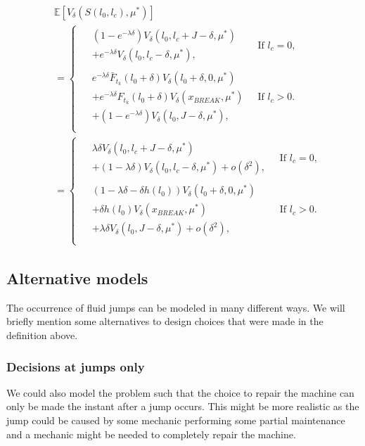 \documentclass[a4paper]{thesis}
\theoremstyle{definition}
\begin{document}
\begin{equation}\label{eq:SimpleFluidNextState}
\begin{split}
&\mathbb{E}[V_\delta(S(l_0,l_c),\mu^*)]\\
&=\begin{cases}
\begin{split}
&(1-e^{-\lambda \delta})V_\delta(l_0,l_c+J-\delta,\mu^*)\\
&+e^{-\lambda \delta}V_\delta(l_0,l_c-\delta,\mu^*),
\end{split}&\ \text{If $l_c=0$,}\\
\begin{split}
&e^{-\lambda \delta} \bar{F}_{t_k}(l_0+\delta)V_\delta(l_0+\delta,0,\mu^*)\\
&+ e^{-\lambda \delta}F_{t_k}(l_0+\delta)V_\delta(x_{BREAK},\mu^*)\\
&+(1-e^{-\lambda \delta})V_\delta(l_0,J-\delta,\mu^*),
\end{split}&\ \text{If $l_c>0$.}\\
\end{cases}\\
&=\begin{cases}
\begin{split}
&\lambda\delta V_\delta(l_0,l_c+J-\delta,\mu^*)\\
&+(1-\lambda \delta)V_\delta(l_0,l_c-\delta,\mu^*)+o(\delta^2),
\end{split}
&\ \text{If $l_c=0$,}\\
\begin{split}
&(1-\lambda \delta-\delta h(l_0))V_\delta(l_0+\delta,0,\mu^*)\\
&+ \delta h(l_0)V_\delta(x_{BREAK},\mu^*)\\
&+\lambda \delta V_\delta(l_0,J-\delta,\mu^*)+o(\delta^2),
\end{split}&\ \text{If $l_c>0$.}\\
\end{cases}
\end{split}
\end{equation}

\subsection{Alternative models}
The occurrence of fluid jumps can be modeled in many different ways.
We will briefly mention some alternatives to design choices that were made in the definition above.
\subsubsection{Decisions at jumps only}
We could also model the problem such that the choice to repair the machine can only be made the instant after a jump occurs.
This might be more realistic as the jump could be caused by some mechanic performing some partial maintenance and a mechanic might be needed to completely repair the machine.
\end{document}
